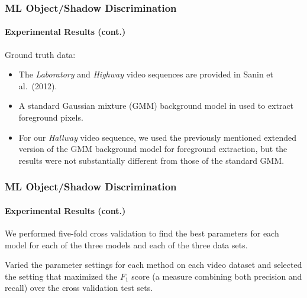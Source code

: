 \begin{frame}
    \frametitle{ML Object/Shadow Discrimination}
    \framesubtitle{Experimental Results (cont.)}

    Ground truth data:
    \begin{itemize}
        \item The {\em Laboratory} and {\em Highway} video sequences are 
            provided in Sanin et al.\ (2012).
        \item A standard Gaussian mixture (GMM) background model in used to 
            extract 
            foreground pixels. 
        \item For our {\em Hallway} video sequence, we used the previously 
            mentioned extended version of the GMM background model for 
            foreground extraction, but the results were not substantially 
            different from those of the standard GMM.
    \end{itemize}

\end{frame}


\ifnum{}

\begin{frame}
    \frametitle{ML Object/Shadow Discrimination}
    \framesubtitle{Experimental Results (cont.)}

    We performed five-fold cross validation to find the best parameters 
    for each model for each of the three models and each of the three 
    data sets.

    \bigskip

    Varied the parameter settings for each method on each video dataset 
    and selected the setting that maximized the $F_1$ score (a measure 
    combining both precision and recall) over the cross validation test 
    sets.

\end{frame}

\fi


